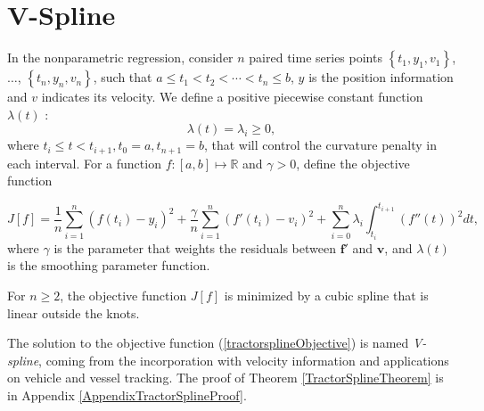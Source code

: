 
\section{V-Spline}\label{SectionTractorSpline}


In the nonparametric regression, consider $n$ paired time series points $\left\lbrace t_1,y_1,v_1\right\rbrace$, $\ldots$, $\left\lbrace t_n,y_n,v_n\right\rbrace$, such that $a \leq t_1<t_2< \cdots < t_n \leq b$, $y$ is the position information and $v$ indicates its velocity. We define a positive piecewise constant function $\lambda(t)$ :
\begin{equation}
\lambda(t) = \lambda_i \geq 0,
\end{equation}
where $t_i \leq t<t_{i+1}, t_0=a, t_{n+1}=b$, that will control the curvature penalty in each interval. For a function $f:[a,b]\mapsto \mathbb{R}$ and $\gamma>0$, define the objective function 

\begin{equation}\label{tractorsplineObjective}
J[f]= \frac{1}{n} \sum_{i=1}^{n} \left( f(t_i)-y_i \right)^2 + \frac{\gamma}{n} \sum_{i=1}^{n} \left( f'(t_i)-v_i \right)^2 +\sum_{i=0}^{n} \lambda_i\int_{t_i}^{t_{i+1}} \left( f''(t)\right)^2 dt,
\end{equation}
where $\gamma$ is the parameter that weights the residuals between $\mathbf{f}'$ and $\mathbf{v}$, and $\lambda(t)$ is the smoothing parameter function.

\begin{theorem}\label{TractorSplineTheorem}
For $n\geq2$, the objective function $J[f]$ is minimized by a cubic spline that is linear outside the knots.
\end{theorem}
The solution to the objective function (\ref{tractorsplineObjective}) is named \textit{V-spline}, coming from the incorporation with velocity information and applications on vehicle and vessel tracking. The proof of Theorem \ref{TractorSplineTheorem} is in Appendix \ref{AppendixTractorSplineProof}. 


